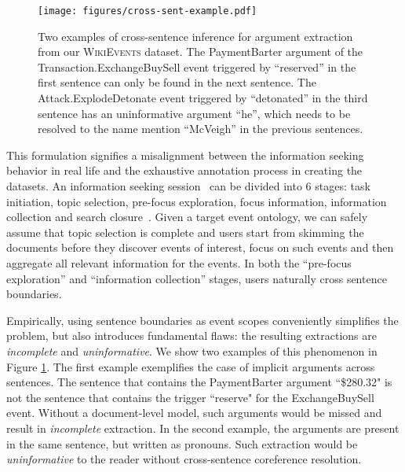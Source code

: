 \begin{figure}
    \centering
    \texttt{[image: figures/cross-sent-example.pdf]}
    \caption{Two examples of cross-sentence inference for argument extraction from our \textsc{WikiEvents} dataset. The PaymentBarter argument of the Transaction.ExchangeBuySell event triggered by ``reserved'' in the first sentence can only be found in the next sentence. 
    The Attack.ExplodeDetonate event triggered by ``detonated'' in the third sentence has an uninformative argument ``he'', which needs to be resolved to the name mention ``McVeigh'' in the previous sentences. 
    }
    \label{fig:intro-ex}
     \vspace{-0.4cm}
\end{figure}
This formulation signifies a misalignment between the information seeking behavior in real life and the exhaustive annotation process in creating the datasets.
An information seeking session~\cite{mai2016looking} can be divided into 6 stages: task initiation, topic selection, pre-focus exploration, focus information, information collection and search closure~\cite{kuhlthau1991searchprocess}. Given a target  event ontology, we can safely assume that topic selection is complete and users start from skimming the documents before they discover events of interest, focus on such events and then aggregate all relevant information for the events. In both the ``pre-focus exploration'' and ``information collection'' stages, users naturally cross sentence boundaries. 

Empirically, using sentence boundaries as event scopes conveniently simplifies the problem, but also introduces fundamental flaws: the resulting extractions are \textit{incomplete} and \textit{uninformative}.
We show two examples of this phenomenon in Figure \ref{fig:intro-ex}. 
The first example exemplifies the case of implicit arguments across sentences. 
The sentence that contains the PaymentBarter argument ``\$280.32" is not the sentence that contains the trigger ``reserve" for the ExchangeBuySell event.
Without a document-level model, such arguments would be missed and result in \textit{incomplete} extraction.
In the second example, the arguments are present in the same sentence, but written as pronouns. Such extraction would be \textit{uninformative} to the reader without cross-sentence coreference resolution.

